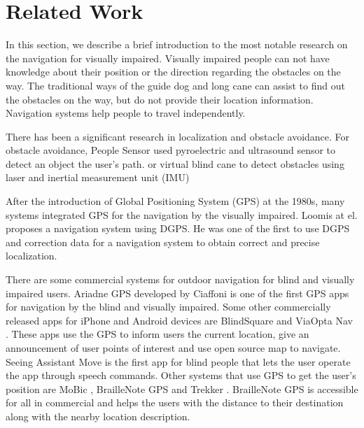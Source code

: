 \chapter{Related Work}
\label{c:relw}

In this section, we describe a brief introduction to the most notable research on the navigation for visually impaired.
Visually impaired people can not have knowledge about their position or the direction regarding the obstacles on the way.
The traditional ways of the guide dog and long cane can assist to find out the obstacles on the way, but do not provide their location information.
Navigation systems help people to travel independently.

There has been a significant research \cite{survey} in localization and obstacle avoidance.
For obstacle avoidance, People Sensor \cite{peoplesensor} used pyroelectric and ultrasound sensor to detect an object the user's path.
or virtual blind cane to detect obstacles using laser and inertial measurement unit (IMU) \cite {virtual}

After the introduction of Global Positioning System (GPS) at the 1980s, many systems integrated GPS for the navigation by the visually impaired.
Loomis at el. \cite{loomis1,loomis,loomis2} proposes a navigation system using DGPS.
He was one of the first to use DGPS and correction data for a navigation system to obtain correct and precise localization.

There are some commercial systems for outdoor navigation for blind and visually impaired users.
Ariadne GPS \cite{arigps} developed by Ciaffoni is one of the first GPS apps for navigation by the blind and visually impaired.
Some other commercially released apps for iPhone and Android devices are BlindSquare \cite{blindsq} and ViaOpta Nav \cite{viaopta}.
These apps use the GPS to inform users the current location, give an announcement of user points of interest and use open source map to navigate.
Seeing Assistant Move \cite{seeing} is the first app for blind people that lets the user operate the app through speech commands.
Other systems that use GPS to get the user’s position are MoBic \cite{mobic}, BrailleNote GPS and Trekker \cite{human}. 
BrailleNote GPS is accessible for all in commercial and helps the users with the distance to their destination along with the nearby location description. 

